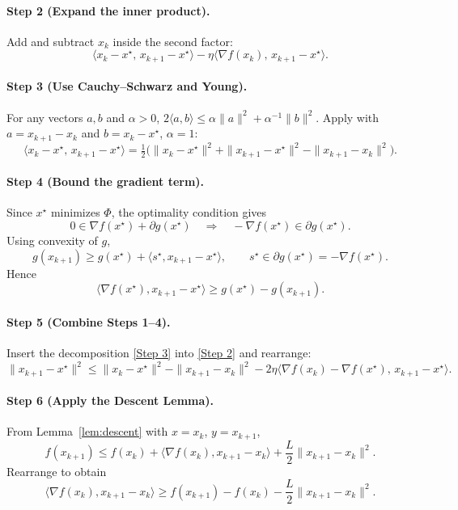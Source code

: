\documentclass{article}
\begin{document}
\begin{enumerate}
\paragraph{Step 2 (Expand the inner product).}
Add and subtract $x_{k}$ inside the second factor:
\[
\langle x_{k}-x^{\star},\,x_{k+1}-x^{\star}\rangle
   -\eta\langle \nabla f(x_{k}),\,x_{k+1}-x^{\star}\rangle .\tag{Step 2}
\]

\paragraph{Step 3 (Use Cauchy–Schwarz and Young).}
For any vectors $a,b$ and $\alpha>0$, $2\langle a,b\rangle\le\alpha\|a\|^{2}+ \alpha^{-1}\|b\|^{2}$.  
Apply with $a=x_{k+1}-x_{k}$ and $b=x_{k}-x^{\star}$, $\alpha=1$:
\[
\langle x_{k}-x^{\star},\,x_{k+1}-x^{\star}\rangle
= \tfrac12\bigl(\|x_{k}-x^{\star}\|^{2}+\|x_{k+1}-x^{\star}\|^{2}
               -\|x_{k+1}-x_{k}\|^{2}\bigr). \tag{Step 3}
\]

\paragraph{Step 4 (Bound the gradient term).}
Since $x^{\star}$ minimizes $\Phi$, the optimality condition gives
\[
0\in\nabla f(x^{\star})+\partial g(x^{\star})\quad\Longrightarrow\quad
-\nabla f(x^{\star})\in\partial g(x^{\star}).
\]
Using convexity of $g$,
\[
g(x_{k+1})\ge g(x^{\star})+\langle s^{\star},x_{k+1}-x^{\star}\rangle ,
\qquad s^{\star}\in\partial g(x^{\star})=-\nabla f(x^{\star}).
\]
Hence
\[
\langle \nabla f(x^{\star}),x_{k+1}-x^{\star}\rangle\ge g(x^{\star})-g(x_{k+1}). \tag{Step 4}
\]

\paragraph{Step 5 (Combine Steps 1–4).}
Insert the decomposition \eqref{Step 3} into \eqref{Step 2} and rearrange:
\[
\|x_{k+1}-x^{\star}\|^{2}
\le \|x_{k}-x^{\star}\|^{2}
      -\|x_{k+1}-x_{k}\|^{2}
      -2\eta\langle \nabla f(x_{k})-\nabla f(x^{\star}),\,x_{k+1}-x^{\star}\rangle . \tag{Step 5}
\]

\paragraph{Step 6 (Apply the Descent Lemma).}
From Lemma~\ref{lem:descent} with $x=x_{k}$, $y=x_{k+1}$,
\[
f(x_{k+1})\le f(x_{k})+\langle\nabla f(x_{k}),x_{k+1}-x_{k}\rangle
            +\frac{L}{2}\|x_{k+1}-x_{k}\|^{2}. \tag{Step 6}
\]
Rearrange to obtain
\[
\langle\nabla f(x_{k}),x_{k+1}-x_{k}\rangle
\ge f(x_{k+1})-f(x_{k})-\frac{L}{2}\|x_{k+1}-x_{k}\|^{2}. \tag{Step 6$'$}
\]


\end{enumerate}
\end{document}
